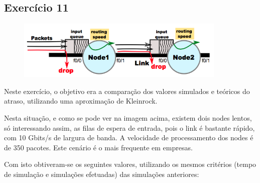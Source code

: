 \documentclass[pdftex,12pt,a4paper]{report}
\begin{document}
\subsection{Exercício 11}
\begin{figure}[!htb]
\center
 \includegraphics[width=100mm,scale=1]{imagensGuia/ex11.png}
 \label{fig:ex11}
\end{figure}

Neste exercício, o objetivo era a comparação dos valores simulados e teóricos do atraso, utilizando uma aproximação de Kleinrock.

Nesta situação, e como se pode ver na imagem acima, existem dois nodes lentos, só interessando assim, as filas de espera de entrada, pois o link é bastante rápido, com 10 Gbits/s de largura de banda. A velocidade de processamento dos nodes é de 350 pacotes. Este cenário é o mais frequente em empresas.

Com isto obtiveram-se os seguintes valores, utilizando os mesmos critérios (tempo de simulação e simulações efetuadas) das simulações anteriores:
\end{document}

